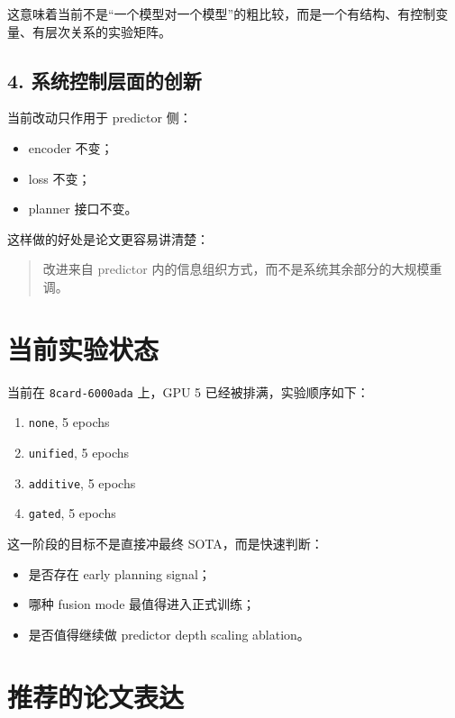 \documentclass[UTF8,a4paper,11pt]{ctexart}
\begin{document}
这意味着当前不是“一个模型对一个模型”的粗比较，而是一个有结构、有控制变量、有层次关系的实验矩阵。

\subsection{4. 系统控制层面的创新}

当前改动只作用于 predictor 侧：

\begin{itemize}[leftmargin=2em]
  \item encoder 不变；
  \item loss 不变；
  \item planner 接口不变。
\end{itemize}

这样做的好处是论文更容易讲清楚：

\begin{quote}
改进来自 predictor 内的信息组织方式，而不是系统其余部分的大规模重调。
\end{quote}

\section{当前实验状态}

当前在 \texttt{8card-6000ada} 上，GPU 5 已经被排满，实验顺序如下：

\begin{enumerate}[leftmargin=2em]
  \item \texttt{none}, 5 epochs
  \item \texttt{unified}, 5 epochs
  \item \texttt{additive}, 5 epochs
  \item \texttt{gated}, 5 epochs
\end{enumerate}

这一阶段的目标不是直接冲最终 SOTA，而是快速判断：

\begin{itemize}[leftmargin=2em]
  \item 是否存在 early planning signal；
  \item 哪种 fusion mode 最值得进入正式训练；
  \item 是否值得继续做 predictor depth scaling ablation。
\end{itemize}

\section{推荐的论文表达}
\end{document}
